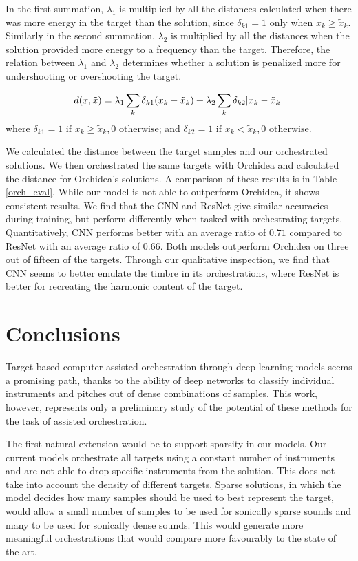 \documentclass[runningheads,a4paper]{llncs}
\begin{document}
In the first summation, $\lambda_1$ is multiplied by all the distances calculated when there was more energy in the target than the solution, since $\delta_{k1} = 1$ only when $x_k \ge \tilde{x}_k$. Similarly in the second summation, $\lambda_2$ is multiplied by all the distances when the solution provided more energy to a frequency than the target. Therefore, the relation between $\lambda_1$ and $\lambda_2$ determines whether a solution is penalized more for undershooting or overshooting the target.

\begin{equation}\label{distance}
d(x, \tilde{x}) =\lambda_1 \sum_k \delta_{k1}(x_k - \tilde{x}_k) + \lambda_2 \sum_k \delta_{k2}|x_k - \tilde{x	}_k| \\
\end{equation}
where $\delta_{k1} = 1 \text{  if  } x_k \ge \tilde{x}_k, 0 \text{  otherwise}$; and $\delta_{k2} = 1 \text{  if  } x_k < \tilde{x}_k, 0 \text{  otherwise}$.

We calculated the distance between the target samples and our orchestrated solutions. We then orchestrated the same targets with Orchidea and calculated the distance for Orchidea's solutions. A comparison of these results is in Table \ref{orch_eval}. While our model is not able to outperform Orchidea, it shows consistent results. We find that the CNN and ResNet give similar accuracies during training, but perform differently when tasked with orchestrating targets. Quantitatively, CNN performs better with an average ratio of $0.71$ compared to ResNet with an average ratio of $0.66$. Both models outperform Orchidea on three out of fifteen of the targets. Through our qualitative inspection, we find that CNN seems to better emulate the timbre in its orchestrations, where ResNet is better for recreating the harmonic content of the target.


\section{Conclusions}
\label{sec:conclusions}

Target-based computer-assisted orchestration through deep learning models seems a promising path, thanks to the ability of deep networks to classify individual instruments and pitches out of dense combinations of samples. This work, however, represents only a preliminary study of the potential of these methods for the task of assisted orchestration. 

The first natural extension would be to support sparsity in our models. Our current models orchestrate all targets using a constant number of instruments and are not able to drop specific instruments from the solution. This does not take into account the density of different targets. Sparse solutions, in which the model decides how many samples should be used to best represent the target, would allow a small number of samples to be used for sonically sparse sounds and many to be used for sonically dense sounds. This would generate more meaningful orchestrations that would compare more favourably to the state of the art.
\end{document}
